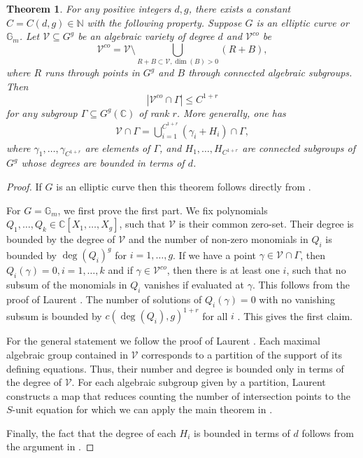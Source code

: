 \documentclass[12pt, reqno]{amsart}
\newcommand{\C}{\mathbb{C}}
\newtheorem{thm}[theorem]{Theorem}
\theoremstyle{remark}
\theoremstyle{definition}
\numberwithin{equation}{section}
\begin{document}
\begin{thm}\label{ML}\cite{DavidPhilippon,Laurent,ESSlinear}  For any positive integers $d, g$, there exists a constant $C = C(d,g) \in \mathbb{N}$ with the following property. Suppose $G$ is an elliptic curve or $\mathbb{G}_m$. Let $\mathcal{V}\subseteq G^g$ be an algebraic variety of degree $d$ and $\mathcal{V}^{co}$ be 
$$\mathcal{V}^{co} = \mathcal{V}\setminus  \bigcup_{R + B \subset \mathcal{V}, \dim (B) > 0} (R + B),$$
where $R$ runs through points in $G^g$ and $B$ through connected algebraic subgroups. Then 
$$|\mathcal{V}^{co} \cap \Gamma|\leq C^{ 1 + r} $$
for any subgroup $\Gamma \subseteq G^g(\C)$ of rank $r$. More generally, one has
\begin{align*}
    \mathcal{V}\cap \Gamma = \bigcup_{i = 1}^{C^{1+r}} (\gamma_i+ H_i)\cap \Gamma,
\end{align*}
 where $\gamma_1, \dots, \gamma_{C^{1+ r}}$ are elements of $\Gamma$, and $H_1, \dots, H_{C^{1+r}}$ are connected subgroups of $G^g$ whose degrees are bounded in terms of $d$.
\end{thm}

\begin{proof} If $G$ is an elliptic curve then this theorem follows directly from \cite[Théorème 1.13]{DavidPhilippon}. 

For $G = \mathbb{G}_m$, we first prove the first part. We fix polynomials $Q_1, \dots, Q_k \in \C[X_1, \dots, X_g]$, such that $\mathcal{V}$ is their common zero-set. Their degree is bounded by the degree of $\mathcal{V}$ and the number of non-zero monomials in $Q_i$ is bounded by $\deg(Q_i)^g$ for $i = 1, \dots, g$. If we have a point $\gamma \in \mathcal{V}\cap \Gamma$, then $Q_i(\gamma) = 0, i = 1, \dots, k$ and if $\gamma \in \mathcal{V}^{co}$, then there is at least one $i$, such that no subsum of the monomials in $Q_i$ vanishes if evaluated at $\gamma$. This follows from the proof of Laurent \cite{Laurent}. The number of solutions of $Q_i(\gamma)= 0$ with no vanishing subsum is bounded by $c(\deg(Q_i),g)^{1 +r}$ for all $i$ \cite{ESSlinear}. This gives the first claim.

For the general statement we follow the proof of Laurent \cite{Laurent}. Each maximal algebraic group contained in $\mathcal{V}$ corresponds to a partition of the support of its defining equations. Thus, their number and degree is bounded only in terms of the degree of $\mathcal{V}$. For each algebraic subgroup given by a partition, Laurent constructs a map that reduces counting the number of intersection points to the $S$-unit equation for which we can apply the main theorem in \cite{ESSlinear}. 

Finally, the fact that the degree of each $H_i$ is bounded in terms of $d$ follows from the argument in \cite[Lemma 2]{Bombieri--Zannier}. 
\end{proof}
\end{document}
